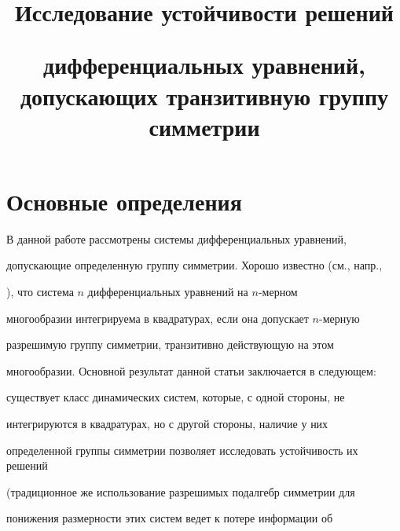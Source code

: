 

\title{Исследование устойчивости решений


дифференциальных уравнений, допускающих транзитивную группу симметрии} 


 


\date{} 




\pagestyle{plain} %


 




\maketitle 


\label{begin} 


 


\section{Основные определения} 


 


В данной работе рассмотрены системы дифференциальных уравнений, 


допускающие определенную группу симметрии. Хорошо известно (см., напр., 


\cite{1}), что система $n$ дифференциальных уравнений на $n$-мерном 


многообразии интегрируема в квадратурах, если она допускает $n$-мерную 


разрешимую группу симметрии, транзитивно действующую на этом 


многообразии. Основной результат данной статьи заключается в следующем: 


существует класс динамических систем, которые, с одной стороны, не 


интегрируются в квадратурах, но с другой стороны, наличие у них


определенной группы симметрии позволяет исследовать устойчивость их решений 


(традиционное же использование разрешимых подалгебр симметрии для 


понижения размерности этих систем ведет к потере информации об 



